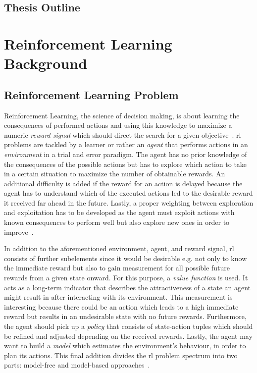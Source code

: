 \documentclass[draft,final]{vutinfth} %
\newcommand{\p}[1]{see p. #1}
\begin{document}
    \section{Thesis Outline}\label{sec:thesis-outline}


    \glsresetall


    \chapter{Reinforcement Learning Background}\label{ch:reinforcement-learning-background}



    \section{Reinforcement Learning Problem}\label{sec:reinforcement-learning-problem}
    Reinforcement Learning, the science of decision making, is about learning the consequences of performed actions and using this knowledge to maximize a numeric \textit{reward signal} which should direct the search for a given objective~\citep[\p{1f}]{sutton_reinforcement_2018}.
    \gls{rl} problems are tackled by a learner or rather an \textit{agent} that performs actions in an \textit{environment} in a trial and error paradigm.
    The agent has no prior knowledge of the consequences of the possible actions but has to explore which action to take in a certain situation to maximize the number of obtainable rewards.
    An additional difficulty is added if the reward for an action is delayed because the agent has to understand which of the executed actions led to the desirable reward it received far ahead in the future.
    Lastly, a proper weighting between exploration and exploitation has to be developed as the agent must exploit actions with known consequences to perform well but also explore new ones in order to improve~\citep{kaelbling_reinforcement_1996}.

    In addition to the aforementioned environment, agent, and reward signal, \gls{rl} consists of further subelements since it would be desirable e.g. not only to know the immediate reward but also to gain measurement for all possible future rewards from a given state onward.
    For this purpose, a \textit{value function} is used.
    It acts as a long-term indicator that describes the attractiveness of a state an agent might result in after interacting with its environment.
    This measurement is interesting because there could be an action which leads to a high immediate reward but results in an undesirable state with no future rewards.
    Furthermore, the agent should pick up a \textit{policy} that consists of state-action tuples which should be refined and adjusted depending on the received rewards.
    Lastly, the agent may want to build a \textit{model} which estimates the environment's behaviour, in order to plan its actions.
    This final addition divides the \gls{rl} problem spectrum into two parts: model-free and model-based approaches~\citep[6f]{sutton_reinforcement_2018}.
\end{document}
